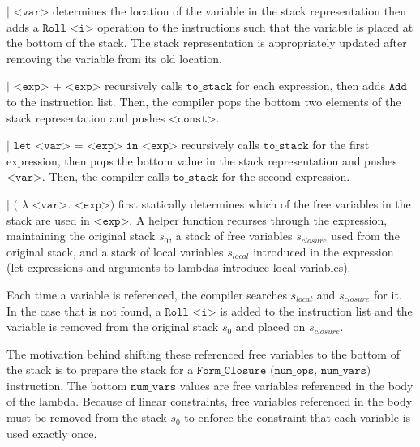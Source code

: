 \documentclass[11pt]{article}
\begin{document}
\medskip

\hspace{10mm}$\texttt{| <var>}$ determines the location of the variable in the stack representation then adds a $\texttt{Roll <i>}$ operation to the instructions such that the variable is placed at the bottom of the stack. The stack representation is appropriately updated after removing the variable from its old location.

\medskip

\hspace{10mm}$\texttt{| <exp> + <exp>}$ recursively calls $\texttt{to\_stack}$ for each expression, then adds $\texttt{Add}$ to the instruction list. Then, the compiler pops the bottom two elements of the stack representation and pushes $\texttt{<const>}$.

\medskip

\hspace{10mm}$\texttt{| let <var> = <exp> in <exp>}$ recursively calls $\texttt{to\_stack}$ for the first expression, then pops the bottom value in the stack representation and pushes $\texttt{<var>}$. Then, the compiler calls $\texttt{to\_stack}$ for the second expression.

\medskip

\hspace{10mm}$\texttt {| (}$ $\lambda$ $\texttt{<var>. <exp>)}$ first statically determines which of the free variables in the stack are used in $\texttt{<exp>}$. A helper function recurses through the expression, maintaining the original stack $s_0$, a stack of free variables $s_{closure}$ used from the original stack, and a stack of local variables $s_{local}$ introduced in the expression (let-expressions and arguments to lambdas introduce local variables). 

Each time a variable is referenced, the compiler searches $s_{local}$ and $s_{closure}$ for it. In the case that is not found, a $\texttt{Roll <i>}$ is added to the instruction list and the variable is removed from the original stack $s_0$ and placed on $s_{closure}$.

The motivation behind shifting these referenced free variables to the bottom of the stack is to prepare the stack for a $\texttt{Form\_Closure (num\_ops, num\_vars)}$ instruction. The bottom $\texttt{num\_vars}$ values are free variables referenced in the body of the lambda. Because of linear constraints, free variables referenced in the body must be removed from the stack $s_0$ to enforce the constraint that each variable is used exactly once.
\end{document}
